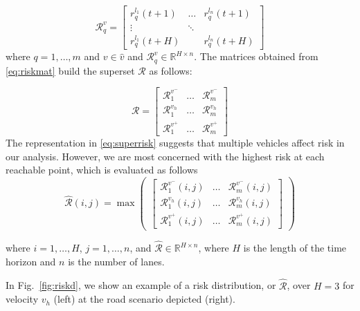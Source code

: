 \documentclass[letterpaper, 10 pt, conference]{ieeeconf}  %
\newcommand\NB[1]{$\spadesuit$\footnote{NB: #1}}
\begin{document}
\begin{equation} \label{eq:riskmat}
\mathcal{R}_{q}^{v}=
\begin{bmatrix}
r_q^{l_1}(t+1) & \dots & r_q^{l_n}(t+1) \\
\vdots & \ddots & \\
r_q^{l_1}(t+H) &    & r_q^{l_n}(t+H)
\end{bmatrix}
\end{equation}
where $q = 1,\ldots,m$ and $v\in\hat{v}$ and $\mathcal{R}_q^v\in\mathbb{R}^{H\times{n}}$. The matrices obtained from \eqref{eq:riskmat} build the superset $\mathcal{R}$ as follows:

\begin{equation} \label{eq:superrisk}
\mathcal{R} =
\begin{bmatrix}
\mathcal{R}_{1}^{v^-} & \ldots & \mathcal{R}_{m}^{v^-} \\
\mathcal{R}_{1}^{v_h} & \ldots & \mathcal{R}_{m}^{v_h} \\
\mathcal{R}_{1}^{v^+} & \ldots   & \mathcal{R}_{m}^{v^+}
\end{bmatrix}
\end{equation}
The representation in \eqref{eq:superrisk} suggests that multiple vehicles affect risk in our analysis. However, we are most concerned with the highest risk at each reachable point, which is evaluated as follows %
\begin{equation} \label{eq:riskdistribution}
 \hat{\mathcal{R}}(i,j) = \max\begin{pmatrix}
 \begin{bmatrix}
\mathcal{R}_{1}^{v^-}(i,j) & \ldots & \mathcal{R}_{m}^{v^-}(i,j) \\
\mathcal{R}_{1}^{v_h}(i,j) & \ldots & \mathcal{R}_{m}^{v_h}(i,j) \\
\mathcal{R}_{1}^{v^+}(i,j) & \ldots   & \mathcal{R}_{m}^{v^+}(i,j)
\end{bmatrix}\end{pmatrix}
\end{equation}

 where $i = 1,\ldots,H$, $j = 1,\ldots,n$, and $\hat{\mathcal{R}} \in \mathbb{R}^{H\times n}$, where $H$ is the length of the time horizon and $n$ is the number of lanes. 
 
 In Fig.~\ref{fig:riskd}, we show an example of a risk distribution, or $\hat{\mathcal{R}}$, over $H=3$ for velocity $v_h$ (left) at the road scenario depicted (right).
 
\end{document}
